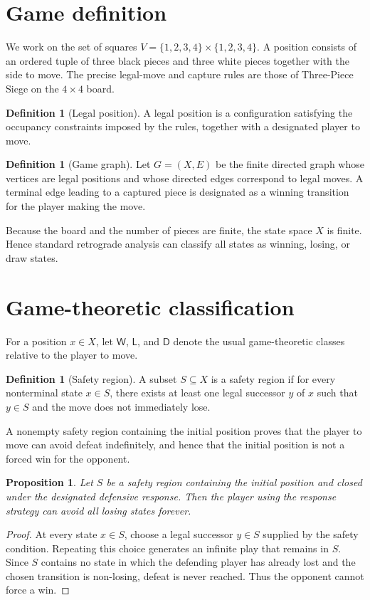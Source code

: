 \documentclass[11pt,a4paper]{article}
\theoremstyle{plain}
\newtheorem{proposition}[theorem]{Proposition}
\theoremstyle{definition}
\newtheorem{definition}[theorem]{Definition}
\newcommand{\Win}{\mathsf{W}}
\newcommand{\Draw}{\mathsf{D}}
\newcommand{\Lose}{\mathsf{L}}
\begin{document}
\section{Game definition}
We work on the set of squares $V=\{1,2,3,4\}\times\{1,2,3,4\}$. A position consists of an ordered tuple of three black pieces and three white pieces together with the side to move. The precise legal-move and capture rules are those of Three-Piece Siege on the $4\times4$ board.
\begin{definition}[Legal position]
A legal position is a configuration satisfying the occupancy constraints imposed by the rules, together with a designated player to move.
\end{definition}
\begin{definition}[Game graph]
Let $G=(X,E)$ be the finite directed graph whose vertices are legal positions and whose directed edges correspond to legal moves. A terminal edge leading to a captured piece is designated as a winning transition for the player making the move.
\end{definition}
Because the board and the number of pieces are finite, the state space $X$ is finite. Hence standard retrograde analysis can classify all states as winning, losing, or draw states.
\section{Game-theoretic classification}
For a position $x\in X$, let $\Win$, $\Lose$, and $\Draw$ denote the usual game-theoretic classes relative to the player to move.
\begin{definition}[Safety region]
A subset $S\subseteq X$ is a safety region if for every nonterminal state $x\in S$, there exists at least one legal successor $y$ of $x$ such that $y\in S$ and the move does not immediately lose.
\end{definition}
A nonempty safety region containing the initial position proves that the player to move can avoid defeat indefinitely, and hence that the initial position is not a forced win for the opponent.
\begin{proposition}
Let $S$ be a safety region containing the initial position and closed under the designated defensive response. Then the player using the response strategy can avoid all losing states forever.
\end{proposition}
\begin{proof}
At every state $x\in S$, choose a legal successor $y\in S$ supplied by the safety condition. Repeating this choice generates an infinite play that remains in $S$. Since $S$ contains no state in which the defending player has already lost and the chosen transition is non-losing, defeat is never reached. Thus the opponent cannot force a win.
\end{proof}
\end{document}
